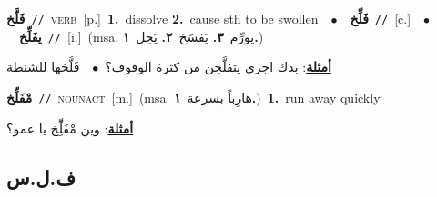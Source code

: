 \documentclass[10pt,a4paper,twoside]{article} %
\begin{document}
\begin{multicols}{2}
{\setlength\topsep{0pt}\textbf{\foreignlanguage{arabic}{فَلَّخ}}\ {\color{gray}\texttt{//}\color{black}}\ \textsc{verb}\ [p.]\ \textbf{1.}~dissolve  \textbf{2.}~cause sth to be swollen\ \ $\bullet$\ \ \setlength\topsep{0pt}\textbf{\foreignlanguage{arabic}{فَلِّخ}}\ {\color{gray}\texttt{//}\color{black}}\ [c.]\ \ $\bullet$\ \ \setlength\topsep{0pt}\textbf{\foreignlanguage{arabic}{يفَلِّخ}}\ {\color{gray}\texttt{//}\color{black}}\ [i.]\ \color{gray}(msa. \foreignlanguage{arabic}{يورِّم}~\foreignlanguage{arabic}{\textbf{٣.}}  \foreignlanguage{arabic}{يَفسَخ}~\foreignlanguage{arabic}{\textbf{٢.}}  \foreignlanguage{arabic}{يَحِل}~\foreignlanguage{arabic}{\textbf{١.}})\color{black}\  \begin{flushright}\color{gray}\foreignlanguage{arabic}{\textbf{\underline{\foreignlanguage{arabic}{أمثلة}}}: بدك اجري يتفلَّخِن من كثرة الوقوف؟\ $\bullet$\ \  فَلَّخها للشنطة}\end{flushright}\color{black}} \vspace{2mm}

{\setlength\topsep{0pt}\textbf{\foreignlanguage{arabic}{مْفَلِّخ}}\ {\color{gray}\texttt{//}\color{black}}\ \textsc{noun\textunderscore act}\ [m.]\ \color{gray}(msa. \foreignlanguage{arabic}{هارِباً بسرعة}~\foreignlanguage{arabic}{\textbf{١.}})\color{black}\ \textbf{1.}~run away quickly\  \begin{flushright}\color{gray}\foreignlanguage{arabic}{\textbf{\underline{\foreignlanguage{arabic}{أمثلة}}}: وين مْفَلِِّّخ يا عمو؟}\end{flushright}\color{black}} \vspace{2mm}

\vspace{-3mm}
\subsection*{\color{blue}\foreignlanguage{arabic}{ف.ل.س}\color{blue}{}} 


\end{multicols}
\end{document}
